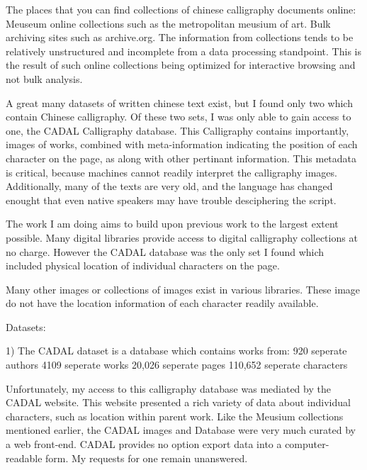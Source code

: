 The places that you can find collections of chinese calligraphy documents online:  Meuseum online collections such as the metropolitan meusium of art.  Bulk archiving sites such as archive.org.  The information from collections tends to be relatively unstructured and incomplete from a data processing standpoint.  This is the result of such online collections being optimized for interactive browsing and not bulk analysis.

A great many datasets of written chinese text exist, but I found only two which contain Chinese calligraphy.  Of these two sets, I was only able to gain access to one, the CADAL Calligraphy database.  This Calligraphy contains importantly, images of works, combined with meta-information indicating the position of each character on the page, as along with other pertinant information.  This metadata is critical, because machines cannot readily interpret the calligraphy images.  Additionally, many of the texts are very old, and the language has changed enought that even native speakers may have trouble desciphering the script.

The work I am doing aims to build upon previous work to the largest extent possible.  Many digital libraries provide access to digital calligraphy collections at no charge.  However the CADAL database was the only set I found which included physical location of individual characters on the page.

   Many other images or collections of images exist in various libraries.  These image do not have the location information of each character readily available.

Datasets:

1)  The CADAL dataset is a database which contains works from:
    920 seperate authors
    4109 seperate works
    20,026 seperate pages
    110,652 seperate characters


Unfortunately, my access to this calligraphy database was mediated by the CADAL website.  This website presented a rich variety of data about individual characters, such as location within parent work.  Like the Meusium collections mentioned earlier, the CADAL images and Database were very much curated by a web front-end.  CADAL provides no option export data into a computer-readable form.  My requests for one remain unanswered.

